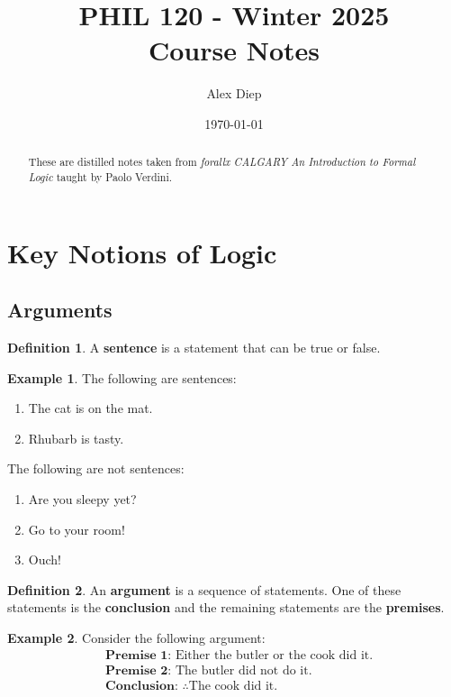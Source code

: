 \documentclass{tufte-handout}
\title{	
	\normalfont\normalsize 
	{PHIL 120 - Winter 2025} \\[0.75em]  %
	\huge Course Notes%
}\author{Alex Diep} %
\date{\vspace{-5pt}\normalsize \today} %
\theoremstyle{definition}
\newtheorem{defn}{Definition}
\theoremstyle{example}
\newtheorem{exmp}{Example}
\theoremstyle{remark}
\begin{document}
\maketitle%

\begin{abstract}
  These are distilled notes taken from \textit{forallx CALGARY An Introduction to Formal Logic} taught by Paolo Verdini.
\end{abstract}

\tableofcontents
\newpage

\pagebreak
\section{Key Notions of Logic}
\subsection{Arguments}
\begin{defn}
  A \textbf{sentence} is a statement that can be true or false.
\end{defn}
\begin{exmp}
  The following are sentences:
  \begin{enumerate}[leftmargin=3\parindent]
    \item The cat is on the mat.
    \item Rhubarb is tasty.
  \end{enumerate}
  The following are not sentences:
  \begin{enumerate}[leftmargin=3\parindent]
    \item Are you sleepy yet?
    \item Go to your room!
    \item Ouch!
  \end{enumerate}
\end{exmp}
\begin{defn}
  An \textbf{argument} is a sequence of statements. One of these statements is the \textbf{conclusion} and the remaining statements are the \textbf{premises}.
\end{defn}
\begin{exmp}
  Consider the following argument:
  \begin{align*}
     & \textbf{Premise 1: } \text{Either the butler or the cook did it.} \\
     & \textbf{Premise 2: } \text{The butler did not do it.}             \\
     & \textbf{Conclusion: } \therefore \text{The cook did it.}
  \end{align*}
\end{exmp}
\end{document}
